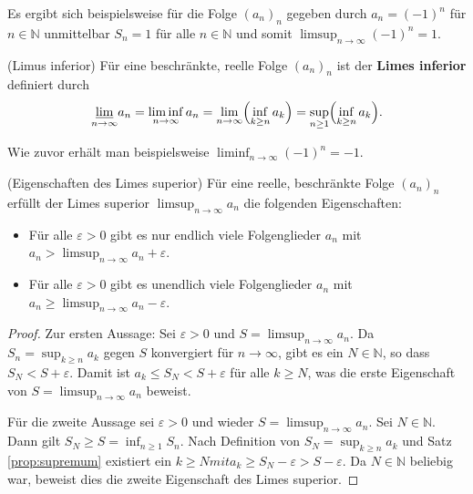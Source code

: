 \documentclass[../Analysis1_script.tex]{subfiles}
\begin{document}
Es ergibt sich beispielsweise für die Folge $(a_n)_n$ gegeben durch $a_n = (-1)^n$ für $n\in \mathbb {N}$ unmittelbar $S_n=1$ für alle $n \in \mathbb {N}$ und somit $\limsup _{n\to \infty }(-1)^n = 1$.

\begin{definition}{(Limus inferior)}
	Für eine beschränkte, reelle Folge $(a_n)_n$ ist der \textbf{Limes inferior} definiert durch
	\[\begin{aligned}[]
		\mathchoice {\underset {{n\to \infty }}{\underline{\lim }}}{\underline{\lim }_{{n\to \infty }}\, }{\underline{\lim }_{{n\to \infty }}\, }{\underline{\lim }_{{n\to \infty }}\, } a_n = \liminf _{n \to \infty } a_n = \lim _{n \to \infty } \Bigl (\inf _{k \geq n} a_k\Bigr ) = \sup _{n \geq 1}\Bigl (\inf _{k \geq n} a_k\Bigr ).
	\end{aligned}\] 
\end{definition}

Wie zuvor erhält man beispielsweise $\liminf _{n\to \infty }(-1)^n = -1$. 

\begin{proposition}{(Eigenschaften des Limes superior)}\label{prop:features_of_lim-sup}
	Für eine reelle, beschränkte Folge $(a_n)_n$ erfüllt der Limes superior $\limsup _{n \to \infty }a_n$ die folgenden Eigenschaften:
	\begin{itemize}
		\item Für alle $\varepsilon >0$ gibt es nur endlich viele Folgenglieder $a_n$ mit $a_n > \limsup _{n \to \infty }a_n + \varepsilon$.
		\item Für alle $\varepsilon >0$ gibt es unendlich viele Folgenglieder $a_n$ mit $a_n \geq \limsup _{n \to \infty }a_n - \varepsilon$.
	\end{itemize} 
\end{proposition}

\begin{proof}
	Zur ersten Aussage: Sei $\varepsilon >0$ und $S = \limsup _{n \to \infty }a_n$. Da $S_n= \sup _{k\geq n}a_k$ gegen $S$ konvergiert für $n \to \infty$, gibt es ein $N \in \mathbb {N}$, so dass $S_N <S+\varepsilon$. Damit ist $a_k \leq S_N<S+\varepsilon$ für alle $k \geq N$, was die erste Eigenschaft von $S = \limsup _{n \to \infty }a_n$ beweist.
	
	Für die zweite Aussage sei $\varepsilon >0$ und wieder $S = \limsup _{n \to \infty }a_n$. Sei $N \in \mathbb {N}$. Dann gilt $S_N \geq S = \inf _{n\geq 1}S_n$. Nach Definition von $S_N = \sup _{k \geq n}a_k$ und Satz \ref{prop:supremum} existiert ein $k \geq N mit a_k \geq S_N - \varepsilon > S-\varepsilon$. Da $N \in \mathbb {N}$ beliebig war, beweist dies die zweite Eigenschaft des Limes superior.
\end{proof}
\end{document}
